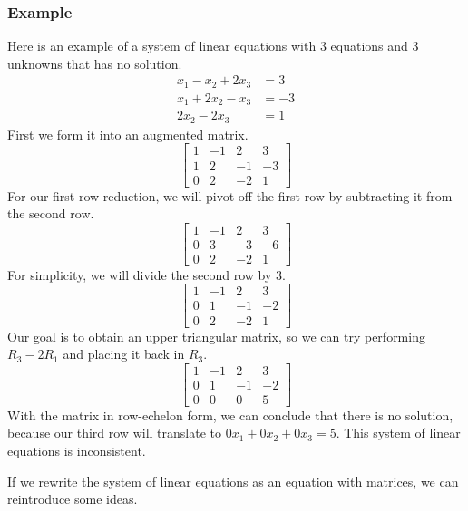 \documentclass{math}
\begin{document}
\subsubsection*{Example}
Here is an example of a system of linear equations with 3 equations and 3
unknowns that has no solution.
\begin{align*}
  x_1-x_2+2x_3 &= 3 \\
  x_1+2x_2-x_3 &= -3 \\
  2x_2-2x_3 &= 1
\end{align*}
First we form it into an augmented matrix.
\[ \begin{bmatrix}
  1 & -1 & 2 & 3 \\
  1 & 2 & -1 & -3 \\
  0 & 2 & -2 & 1
\end{bmatrix} \]
For our first row reduction, we will pivot off the first row by subtracting it
from the second row.
\[ \begin{bmatrix}
  1 & -1 & 2 & 3 \\
  0 & 3 & -3 & -6 \\
  0 & 2 & -2 & 1
\end{bmatrix} \]
For simplicity, we will divide the second row by 3.
\[ \begin{bmatrix}
  1 & -1 & 2 & 3 \\
  0 & 1 & -1 & -2 \\
  0 & 2 & -2 & 1
\end{bmatrix} \]
Our goal is to obtain an upper triangular matrix, so we can try performing
\( R_3-2R_1 \) and placing it back in \( R_3 \).
\[ \begin{bmatrix}
  1 & -1 & 2 & 3 \\
  0 & 1 & -1 & -2 \\
  0 & 0 & 0 & 5
\end{bmatrix} \]
With the matrix in row-echelon form, we can conclude that there is no solution,
because our third row will translate to \( 0x_1+0x_2+0x_3 = 5 \). This system
of linear equations is inconsistent. \par
If we rewrite the system of linear equations as an equation with matrices, we
can reintroduce some ideas.
\end{document}
